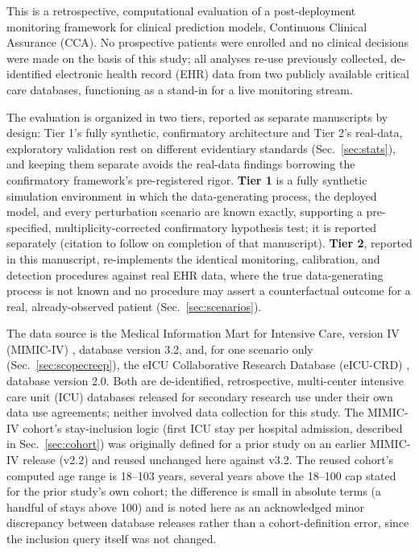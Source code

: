 \documentclass[apajournal,article,submit,oneauthor]{Definitions/mdpi}
\begin{document}
This is a retrospective, computational evaluation of a post-deployment monitoring framework for clinical prediction models, Continuous Clinical Assurance (CCA). No prospective patients were enrolled and no clinical decisions were made on the basis of this study; all analyses re-use previously collected, de-identified electronic health record (EHR) data from two publicly available critical care databases, functioning as a stand-in for a live monitoring stream.

The evaluation is organized in two tiers, reported as separate manuscripts by design: Tier 1's fully synthetic, confirmatory architecture and Tier 2's real-data, exploratory validation rest on different evidentiary standards (Sec.~\ref{sec:stats}), and keeping them separate avoids the real-data findings borrowing the confirmatory framework's pre-registered rigor. \textbf{Tier 1} is a fully synthetic simulation environment in which the data-generating process, the deployed model, and every perturbation scenario are known exactly, supporting a pre-specified, multiplicity-corrected confirmatory hypothesis test; it is reported separately (citation to follow on completion of that manuscript). \textbf{Tier 2}, reported in this manuscript, re-implements the identical monitoring, calibration, and detection procedures against real EHR data, where the true data-generating process is not known and no procedure may assert a counterfactual outcome for a real, already-observed patient (Sec.~\ref{sec:scenarios}).

The data source is the Medical Information Mart for Intensive Care, version IV (MIMIC-IV) \citep{johnson2023}, database version 3.2, and, for one scenario only (Sec.~\ref{sec:scopecreep}), the eICU Collaborative Research Database (eICU-CRD) \citep{pollard2018}, database version 2.0. Both are de-identified, retrospective, multi-center intensive care unit (ICU) databases released for secondary research use under their own data use agreements; neither involved data collection for this study. The MIMIC-IV cohort's stay-inclusion logic (first ICU stay per hospital admission, described in Sec.~\ref{sec:cohort}) was originally defined for a prior study on an earlier MIMIC-IV release (v2.2) and reused unchanged here against v3.2. The reused cohort's computed age range is 18--103 years, several years above the 18--100 cap stated for the prior study's own cohort; the difference is small in absolute terms (a handful of stays above 100) and is noted here as an acknowledged minor discrepancy between database releases rather than a cohort-definition error, since the inclusion query itself was not changed.
\end{document}
